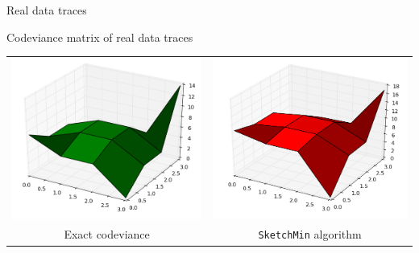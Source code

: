 \documentclass[mathserif]{beamer}
\begin{document}
	\begin{frame}{Real data traces}
		
	\begin{center}
		\begin{block}{Codeviance matrix of real data traces}
		\end{block}
		\begin{tabular}{cc}
			\includegraphics[scale=0.26]{realtests_real1.png} &
			\includegraphics[scale=0.26]{realtests_sketchmin1.png} \\
			Exact codeviance & \texttt{SketchMin} algorithm \\
		\end{tabular}
	\end{center}
		
	\end{frame}
	
\end{document}
